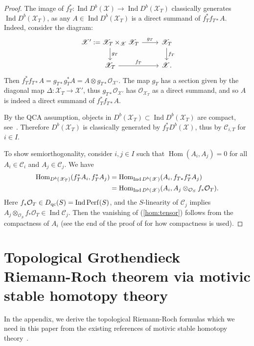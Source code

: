 \documentclass [11pt,oneside,a4paper,mathscr]{amsart}
\theoremstyle{definition}
\newcommand{\X}{\mathscr{X}}
\newcommand{\Ind}{\operatorname{Ind}}
\newcommand{\Hom}{\operatorname{Hom}}
\begin{document}
\begin{proof}
    The image of $f_T^{\ast} \colon \Ind D^b(\X) \to \Ind D^b(\X_T)$ 
    classically generates $\Ind D^b(\X_T)$, as 
    any $A \in \Ind D^b(\X_T)$ is a direct summand of $f_T^{\ast}f_{T\ast}A$. Indeed, consider the diagram:
    \begin{equation*}
        \begin{tikzcd}
           \X':=\X_T\times_{\X}\X_T\arrow[d, "g_T"]\arrow[r, "g_T"]& \X_T\arrow[d, "f_T"]\\
            \X_T\arrow[r, "f_T"]&\X.
        \end{tikzcd}
    \end{equation*}
    Then $f_T^*f_{T*}A=g_{T*}g_T^*A=A\otimes g_{T*}\mathcal{O}_{\X'}$. The map $g_T$ has a section given by the diagonal map $\Delta\colon \X_T\to \X'$, thus $g_{T*}\mathcal{O}_{\X'}$ has $\mathcal{O}_{\X_T}$ as a direct summand, and so $A$ is indeed a direct summand of $f_T^{\ast}f_{T\ast}A$.
    
    By the QCA assumption, objects in $D^b(\X_T) \subset \Ind D^b(\X_T)$ are compact, 
    see~\cite{MR3037900}. 
    Therefore $D^b(\X_T)$ is classically generated by 
    $f_T^{\ast} D^b(\X)$, thus by $\mathscr{C}_{i, T}$ for $i\in I$. 
    
    To show semiorthogonality, 
    consider $i,j\in I$ such that $\Hom(A_i, A_j)=0$ for all $A_i\in \mathscr{C}_i$ and $A_j\in \mathscr{C}_j$. 
We have 
\begin{align}\notag
    \Hom_{D^b(\X_T)}(f_T^{\ast}A_i, f_T^{\ast}A_j)&=\Hom_{\Ind D^b(\X)}(A_i, f_{T\ast}f_T^{\ast}A_j) \\
 \label{hom:tensor}   &=\Hom_{\Ind D^b(\X)}(A_i, A_j \otimes_{\mathcal{O}_S}f_{\ast}\mathcal{O}_T). 
\end{align}
    Here $f_{\ast}\mathcal{O}_T \in D_{\rm{qc}}(S)=\Ind \mathrm{Perf}(S)$, 
    and the $S$-linearity of $\mathscr{C}_j$ implies 
    $A_j \otimes_{\mathcal{O}_S} f_{\ast}\mathcal{O}_T \in \Ind \mathscr{C}_j$. 
    Then the vanishing of (\ref{hom:tensor}) follows from 
    the compactness of $A_i$ (see the end of the proof of \cite[Lemma 5.5]{PTK3} for how compactness is used). 
\end{proof}

\appendix

\section{Topological Grothendieck Riemann-Roch theorem via motivic stable homotopy theory}\label{subsec:append}
In the appendix, we derive the topological Riemann-Roch formulas which we need in this paper from the existing references of motivic stable homotopy theory~\cite{DJK, Deg2, Ayoub}. 
\end{document}
